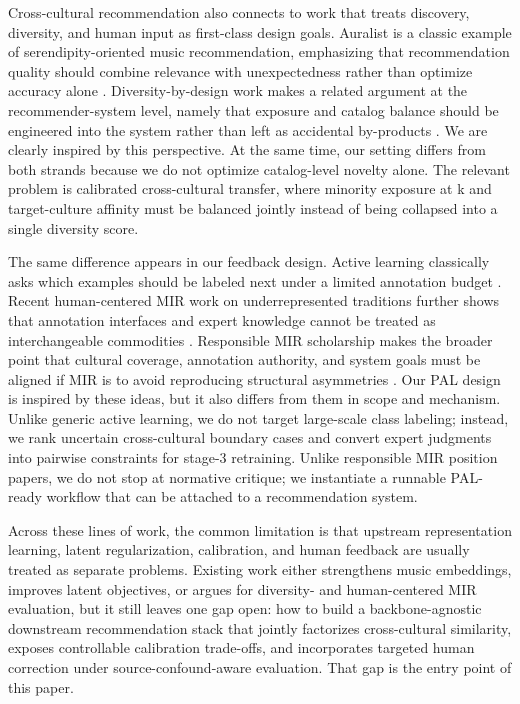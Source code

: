 Cross-cultural recommendation also connects to work that treats discovery, diversity, and human input as first-class design goals. Auralist is a classic example of serendipity-oriented music recommendation, emphasizing that recommendation quality should combine relevance with unexpectedness rather than optimize accuracy alone \cite{zhang2012auralist}. Diversity-by-design work makes a related argument at the recommender-system level, namely that exposure and catalog balance should be engineered into the system rather than left as accidental by-products \cite{porcaro2021diversity}. We are clearly inspired by this perspective. At the same time, our setting differs from both strands because we do not optimize catalog-level novelty alone. The relevant problem is calibrated cross-cultural transfer, where minority exposure at k and target-culture affinity must be balanced jointly instead of being collapsed into a single diversity score.

The same difference appears in our feedback design. Active learning classically asks which examples should be labeled next under a limited annotation budget \cite{settles2009active}. Recent human-centered MIR work on underrepresented traditions further shows that annotation interfaces and expert knowledge cannot be treated as interchangeable commodities \cite{pinto2025maracatu}. Responsible MIR scholarship makes the broader point that cultural coverage, annotation authority, and system goals must be aligned if MIR is to avoid reproducing structural asymmetries \cite{holzapfel2018ethical,huang2023beyonddatasets}. Our PAL design is inspired by these ideas, but it also differs from them in scope and mechanism. Unlike generic active learning, we do not target large-scale class labeling; instead, we rank uncertain cross-cultural boundary cases and convert expert judgments into pairwise constraints for stage-3 retraining. Unlike responsible MIR position papers, we do not stop at normative critique; we instantiate a runnable PAL-ready workflow that can be attached to a recommendation system.

Across these lines of work, the common limitation is that upstream representation learning, latent regularization, calibration, and human feedback are usually treated as separate problems. Existing work either strengthens music embeddings, improves latent objectives, or argues for diversity- and human-centered MIR evaluation, but it still leaves one gap open: how to build a backbone-agnostic downstream recommendation stack that jointly factorizes cross-cultural similarity, exposes controllable calibration trade-offs, and incorporates targeted human correction under source-confound-aware evaluation. That gap is the entry point of this paper.
